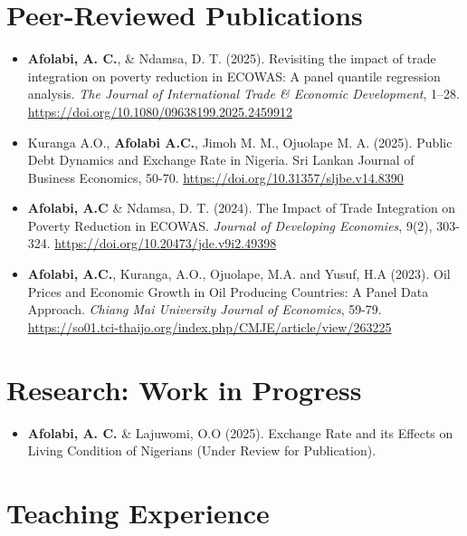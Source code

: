 \documentclass[10pt, letterpaper]{article}
\begin{document}
    \section{Peer-Reviewed Publications}
\begin{itemize}
    \item \textbf{Afolabi, A. C.}, \& Ndamsa, D. T. (2025). Revisiting the impact of trade integration on poverty reduction in ECOWAS: A panel quantile regression analysis. \textit{The Journal of International Trade \& Economic Development}, 1–28. \href{https://doi.org/10.1080/09638199.2025.2459912}{https://doi.org/10.1080/09638199.2025.2459912} 
    \item Kuranga A.O., \textbf{Afolabi A.C.}, Jimoh M. M., Ojuolape M. A. (2025).  Public Debt Dynamics and Exchange Rate in Nigeria. Sri Lankan Journal of Business Economics, 50-70. \href{https://doi.org/10.31357/sljbe.v14.8390}{https://doi.org/10.31357/sljbe.v14.8390}

    \item \textbf{Afolabi, A.C} \& Ndamsa, D. T. (2024). The Impact of Trade Integration on Poverty Reduction in ECOWAS. \textit{Journal of Developing Economies}, 9(2), 303-324. \href{https://doi.org/10.20473/jde.v9i2.49398} {https://doi.org/10.20473/jde.v9i2.49398}
    \item \textbf{Afolabi, A.C.}, Kuranga, A.O., Ojuolape, M.A. and Yusuf, H.A (2023). Oil Prices and Economic Growth in Oil Producing Countries: A Panel Data Approach. \textit{Chiang Mai University Journal of Economics}, 59-79. \href{https://so01.tci-thaijo.org/index.php/CMJE/article/view/263225}{https://so01.tci-thaijo.org/index.php/CMJE/article/view/263225}
\end{itemize}


    
    \section{Research: Work in Progress}
\begin{itemize}
    \item \textbf{Afolabi, A. C. }\& Lajuwomi, O.O (2025). Exchange Rate and its Effects on Living Condition of Nigerians (Under Review for Publication).
\end{itemize}


\section{Teaching Experience}
\end{document}
